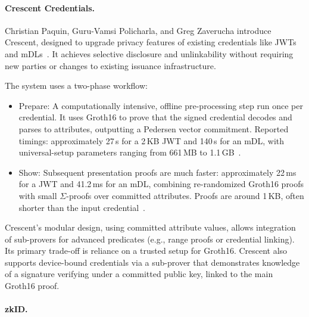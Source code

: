 \paragraph{Crescent Credentials.} 
Christian Paquin, Guru-Vamsi Policharla, and Greg Zaverucha introduce Crescent, designed to upgrade privacy features of existing credentials like JWTs and mDLs~\cite{cryptoeprint:2024/2013}. It achieves selective disclosure and unlinkability without requiring new parties or changes to existing issuance infrastructure.

The system uses a two-phase workflow:
\begin{itemize}
  \item Prepare: A computationally intensive, offline pre-processing step run once per credential. It uses Groth16 to prove that the signed credential decodes and parses to attributes, outputting a Pedersen vector commitment. Reported timings: approximately 27\,s for a 2\,KB JWT and 140\,s for an mDL, with universal-setup parameters ranging from 661\,MB to 1.1\,GB~\cite[\S4]{cryptoeprint:2024/2013}.
  \item Show: Subsequent presentation proofs are much faster: approximately 22\,ms for a JWT and 41.2\,ms for an mDL, combining re-randomized Groth16 proofs with small $\Sigma$-proofs over committed attributes. Proofs are around 1\,KB, often shorter than the input credential~\cite[\S4]{cryptoeprint:2024/2013}.
\end{itemize}

Crescent’s modular design, using committed attribute values, allows integration of sub-provers for advanced predicates (e.g., range proofs or credential linking). Its primary trade-off is reliance on a trusted setup for Groth16. Crescent also supports device-bound credentials via a sub-prover that demonstrates knowledge of a signature verifying under a committed public key, linked to the main Groth16 proof.

\paragraph{zkID.}

